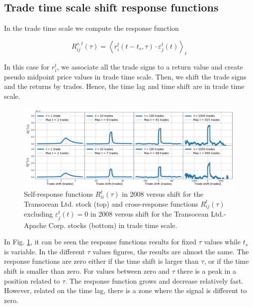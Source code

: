 \subsection{Trade time scale shift response functions}
\label{subsec:time_shift_trade}

In the trade time scale we compute the response function

\begin{equation}\label{eq:time_shift_trade}
    R_{ij}^{s, t}\left(\tau\right)=\left\langle r^{t}_{i}
    \left(t-t_{s},\tau\right) \cdot\varepsilon^{t}_{j}
    \left(t\right)\right\rangle _{t}
\end{equation}

In this case for $r^{t}_{i}$, we associate all the trade signs to a return
value and create pseudo midpoint price values in trade time scale. Then, we
shift the trade signs and the returns by trades. Hence, the time lag and time
shift are in trade time scale.

\begin{figure}[htbp]
    \centering
    \includegraphics[width=\textwidth]{figures/04_shift_trade_RIG_APA.png}
    \caption{Self-response functions $R_{ii}^{t}\left(\tau\right)$ in 2008
             versus shift for the Transocean Ltd. stock (top) and
             cross-response functions $R_{ij}^{t}\left(\tau\right)$ excluding
             $\varepsilon^{t}_{j}\left(t\right) = 0$ in 2008 versus shift for
             the Transocean Ltd.-Apache Corp. stocks (bottom) in trade time
             scale.}
    \label{fig:shift_trade_scale}
\end{figure}

In Fig. \ref{fig:shift_trade_scale}, it can be seen the response functions
results for fixed $\tau$ values while $t_{s}$ is variable. In the different
$\tau$ values figures, the results are almost the same. The response functions
are zero either if the time shift is larger than $\tau$, or if the time shift
is smaller than zero. For values between zero and $\tau$ there is a peak in a
position related to $\tau$. The response function grows and decrease relatively
fast. However, related on the time lag, there is a zone where the signal is
different to zero.

